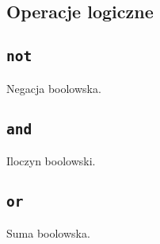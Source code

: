 \subsection{Operacje logiczne}
\label{viua_vm_ops_boolean_logic}

\subsection{\texttt{not}}

Negacja boolowska.

\subsection{\texttt{and}}

Iloczyn boolowski.

\subsection{\texttt{or}}

Suma boolowska.
